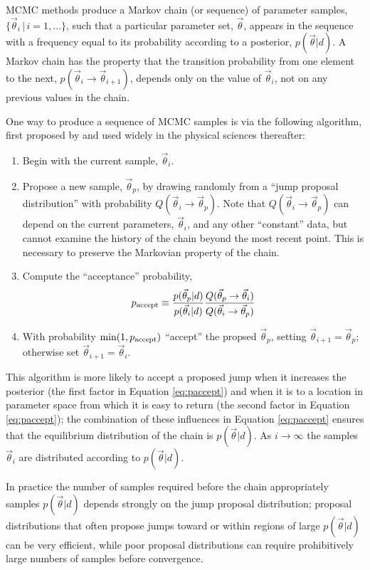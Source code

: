 \documentclass[preprint]{aastex}
\newcommand{\vtheta}{\vec{\theta}}
\begin{document}
MCMC methods produce a Markov chain (or sequence) of parameter
samples, $\{ \vtheta_i \, | \, i = 1, \ldots \}$, such that a particular
parameter set, $\vtheta$, appears in the sequence with a frequency
equal to its probability according to a posterior, $p(\vtheta|d)$.  A
Markov chain has the property that the transition probability from one
element to the next, $p(\vtheta_i \to \vtheta_{i+1})$, depends only on
the value of $\vtheta_i$, not on any previous values in the chain.

One way to produce a sequence of MCMC samples is via the following
algorithm, first proposed by \citet{Metropolis1953} and used widely in
the physical sciences thereafter:
\begin{enumerate}
  \item Begin with the current sample, $\vtheta_i$.
  \item Propose a new sample, $\vtheta_p$, by drawing randomly from a
    ``jump proposal distribution'' with probability $Q(\vtheta_i \to
    \vtheta_p)$.  Note that $Q(\vtheta_i \to \vtheta_p)$ can depend on
    the current parameters, $\vtheta_i$, and any other ``constant''
    data, but cannot examine the history of the chain beyond the most
    recent point.  This is necessary to preserve the Markovian
    property of the chain.
  \item Compute the ``acceptance'' probability,
    \begin{equation}
      \label{eq:paccept}
      p_{\textnormal{accept}} \equiv
      \frac{p(\vtheta_p|d)}{p(\vtheta_i|d)} \frac{Q(\vtheta_p \to
        \vtheta_i)}{Q(\vtheta_i \to \vtheta_p)}
    \end{equation}
  \item With probability $\min(1,p_{\textnormal{accept}})$ ``accept''
    the propsed $\vtheta_p$, setting $\vtheta_{i+1} = \vtheta_p$;
    otherwise set $\vtheta_{i+1} = \vtheta_i$.
\end{enumerate}
This algorithm is more likely to accept a proposed jump when it
increases the posterior (the first factor in Equation
\eqref{eq:paccept}) and when it is to a location in parameter space
from which it is easy to return (the second factor in Equation
\eqref{eq:paccept}); the combination of these influences in Equation
\eqref{eq:paccept} ensures that the equilibrium distribution of the
chain is $p(\vtheta|d)$.  As $i \to \infty$ the samples $\vtheta_i$
are distributed according to $p(\vtheta|d)$.  

In practice the number of samples required before the chain
appropriately samples $p(\vtheta|d)$ depends strongly on the jump
proposal distribution; proposal distributions that often propose jumps
toward or within regions of large $p(\vtheta|d)$ can be very
efficient, while poor proposal distributions can require prohibitively
large numbers of samples before convergence.  
\end{document}
